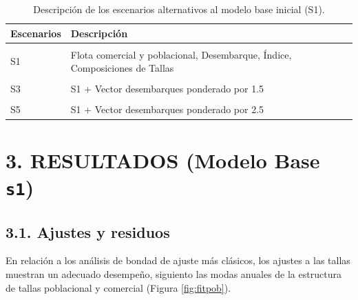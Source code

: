 \documentclass[
]{article}
\begin{document}
\begin{table}[h!]

\caption{\label{tab:unnamed-chunk-9}\label{Tab2}Descripción de los escenarios alternativos al modelo base inicial (S1).}
\centering
\fontsize{10}{12}\selectfont
\begin{tabular}[t]{ll}
\toprule
Escenarios & Descripción\\
\midrule
\cellcolor{gray!6}{S01} & \cellcolor{gray!6}{Solo Desembarque e Índice}\\
S1 & Flota comercial y poblacional, Desembarque, Índice, Composiciones de Tallas\\
\cellcolor{gray!6}{S2} & \cellcolor{gray!6}{S1 + Vector Desembarques desde 1990 asumido en 250 por año}\\
S3 & S1 + Vector desembarques ponderado por 1.5\\
\cellcolor{gray!6}{S4} & \cellcolor{gray!6}{S1 + Vector desembarques ponderado por 2}\\
\addlinespace
S5 & S1 + Vector desembarques ponderado por 2.5\\
\bottomrule
\end{tabular}
\end{table}

\pagebreak

\hypertarget{resultados-modelo-base-s1}{%
\section{\texorpdfstring{3. RESULTADOS (Modelo Base \texttt{s1})}{3. RESULTADOS (Modelo Base s1)}}\label{resultados-modelo-base-s1}}

\hypertarget{ajustes-y-residuos}{%
\subsection{3.1. Ajustes y residuos}\label{ajustes-y-residuos}}

En relación a los análisis de bondad de ajuste más clásicos, los ajustes a las tallas muestran un adecuado desempeño, siguiento las modas anuales de la estructura de tallas poblacional y comercial (Figura \ref{fig:fitpob}).
\end{document}
